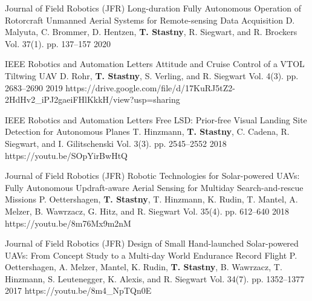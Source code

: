 \begin{cventries}


\begin{flushleft}
\end{flushleft}

\cvpubentry
	{Journal of Field Robotics (JFR)} %
	{Long-duration Fully Autonomous Operation of Rotorcraft Unmanned Aerial Systems for Remote-sensing Data Acquisition} %
	{D. Malyuta, C. Brommer, D. Hentzen, \textbf{T. Stastny}, R. Siegwart, and R. Brockers} %
	{Vol. 37(1). pp. 137--157} %
	{2020} %
	{} %
	{} %

\cvpubentry
	{IEEE Robotics and Automation Letters} %
	{Attitude and Cruise Control of a VTOL Tiltwing UAV} %
	{D. Rohr, \textbf{T. Stastny}, S. Verling, and R. Siegwart} %
	{Vol. 4(3). pp. 2683--2690} %
	{2019} %
	{https://drive.google.com/file/d/17KuRJ5tZ2-2HdHv2\_iPJ2gaeiFHlKkkH/view?usp=sharing} %
	{} %

\cvpubentry
	{IEEE Robotics and Automation Letters} %
	{Free LSD: Prior-free Visual Landing Site Detection for Autonomous Planes} %
	{T. Hinzmann, \textbf{T. Stastny}, C. Cadena, R. Siegwart, and I. Gilitschenski} %
	{Vol. 3(3). pp. 2545--2552} %
	{2018} %
	{https://youtu.be/SOpYirBwHtQ} %
	{} %
	
\cvpubentry
	{Journal of Field Robotics (JFR)} %
	{Robotic Technologies for Solar-powered UAVs: Fully Autonomous Updraft-aware Aerial Sensing for Multiday Search-and-rescue Missions} %
	{P. Oettershagen, \textbf{T. Stastny}, T. Hinzmann, K. Rudin, T. Mantel, A. Melzer, B. Wawrzacz, G. Hitz, and R. Siegwart} %
	{Vol. 35(4). pp. 612--640} %
	{2018} %
	{https://youtu.be/8m76Mx9m2nM} %
	{} %

\cvpubentry
	{Journal of Field Robotics (JFR)} %
	{Design of Small Hand-launched Solar-powered UAVs: From Concept Study to a Multi-day World Endurance Record Flight} %
	{P. Oettershagen, A. Melzer, Mantel, K. Rudin, \textbf{T. Stastny}, B. Wawrzacz, T. Hinzmann, S. Leutenegger, K. Alexis, and R. Siegwart} %
	{Vol. 34(7). pp. 1352--1377} %
	{2017} %
	{https://youtu.be/8m4\_NpTQn0E} %
	{} %


\end{cventries}
